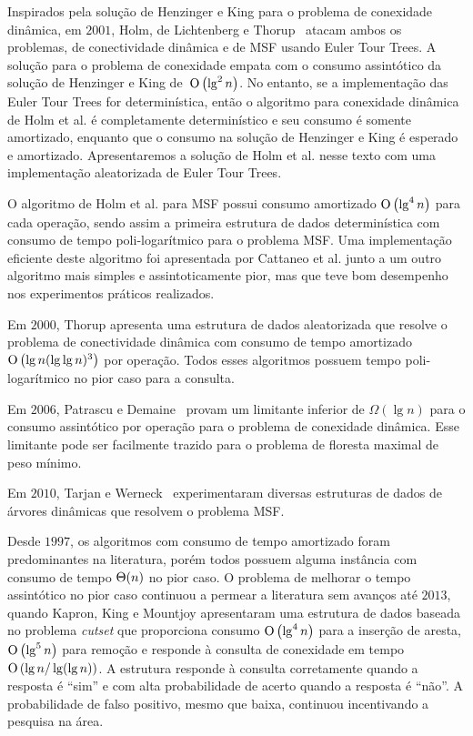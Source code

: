 Inspirados pela solução de Henzinger e King para o problema de conexidade dinâmica, em $2001$, Holm, de Lichtenberg e Thorup~\cite{poly_log} atacam ambos os problemas, de conectividade dinâmica e de MSF usando Euler Tour Trees. A solução para o problema de conexidade empata com o consumo assintótico da solução de Henzinger e King de~$\text{O}\left(\lg^2 n\right)$. No entanto, se a implementação das Euler Tour Trees for determinística, então o algoritmo para conexidade dinâmica de Holm et al. é completamente determinístico e seu consumo é somente amortizado, enquanto que o consumo na solução de Henzinger e King é esperado e amortizado. Apresentaremos a solução de Holm et al. nesse texto com uma implementação aleatorizada de Euler Tour Trees.

O algoritmo de Holm et al. para MSF possui consumo amortizado $\text{O}\left(\lg^4 n\right)$ para cada operação, sendo assim a primeira estrutura de dados determinística com consumo de tempo poli-logarítmico para o problema MSF. Uma implementação eficiente deste algoritmo foi apresentada por Cattaneo et al. \cite{xpstudy2002} junto a um outro algoritmo mais simples e assintoticamente pior, mas que teve bom desempenho nos experimentos práticos realizados.

Em $2000$, Thorup \cite{Thorup2000} apresenta uma estrutura de dados aleatorizada que resolve o problema de conectividade dinâmica com consumo de tempo amortizado $\text{O}\left(\lg n(\lg\lg n)^3\right)$ por operação. Todos esses algoritmos possuem tempo poli-logarítmico no pior caso para a consulta.

Em $2006$, Patrascu e Demaine~\cite{lowerBoundPatrascu} provam um limitante inferior de $\Omega(\lg n)$ para o consumo assintótico por operação para o problema de conexidade dinâmica. Esse limitante pode ser facilmente trazido para o problema de floresta maximal de peso mínimo.

Em $2010$, Tarjan e Werneck~\cite{tarjanWerneck2010} experimentaram diversas estruturas de dados de árvores dinâmicas que resolvem o problema MSF.


Desde $1997$, os algoritmos com consumo de tempo amortizado foram predominantes na literatura, porém todos possuem alguma instância com consumo de tempo $\Theta(n)$ no pior caso. O problema de melhorar o tempo assintótico no pior caso continuou a permear a literatura sem avanços até $2013$, quando Kapron, King e Mountjoy \cite{bruceM} apresentaram uma estrutura de dados baseada no problema \textit{cutset} que proporciona consumo $\text{O}\left(\lg^4 n\right)$ para a inserção de aresta, $\text{O}\left(\lg^5 n\right)$ para remoção e responde à consulta de conexidade em tempo $\text{O}\left(\lg n / \lg(\lg n)\right)$. A estrutura responde à consulta corretamente quando a resposta é “sim” e com alta probabilidade de acerto quando a resposta é “não”. A probabilidade de falso positivo, mesmo que baixa, continuou incentivando a pesquisa na área. 

